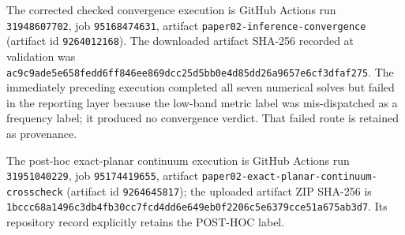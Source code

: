 \documentclass[aps,pra,onecolumn,superscriptaddress,nofootinbib]{revtex4-2}
\begin{document}
The corrected checked convergence execution is GitHub Actions run \texttt{31948607702}, job \texttt{95168474631}, artifact \texttt{paper02-inference-convergence} (artifact id \texttt{9264012168}).  The downloaded artifact SHA-256 recorded at validation was \texttt{ac9c9ade5e658fedd6ff846ee869dcc25d5bb0e4d85dd26a9657e6cf3dfaf275}.  The immediately preceding execution completed all seven numerical solves but failed in the reporting layer because the low-band metric label was mis-dispatched as a frequency label; it produced no convergence verdict.  That failed route is retained as provenance.

The post-hoc exact-planar continuum execution is GitHub Actions run \texttt{31951040229}, job \texttt{95174419655}, artifact \texttt{paper02-exact-planar-continuum-crosscheck} (artifact id \texttt{9264645817}); the uploaded artifact ZIP SHA-256 is \texttt{1bccc68a1496c3db4fb30cc7fcd4dd6e649eb0f2206c5e6379cce51a675ab3d7}.  Its repository record explicitly retains the POST-HOC label.



\end{document}
